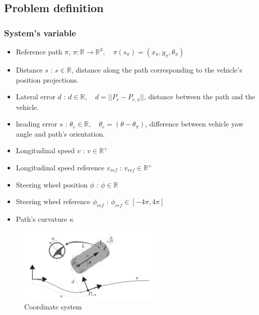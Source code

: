 \subsection{Problem definition}
\subsubsection*{System's variable}
\begin{itemize}
    \item Reference path $\pi$, $\pi : \mathbb{R} \longrightarrow \mathbb{R}^3, \quad \pi(s_\pi) = (x_\pi, y_\pi,\theta_\pi)$
    \item Distance $s$ : $s \in \mathbb{R}$, distance along the path corresponding to the vehicle’s position projections.
    \item Lateral error $d$ : $d \in \mathbb{R},\quad d = ||P_r - P_{r,\pi}||$, distance between the path and the vehicle.
    \item heading error $s$ : $\theta_e \in \mathbb{R}, \quad \theta_e = (\theta - \theta_\pi)$, difference between vehicle yaw angle and path's orientation.
    \item Longitudinal speed $v$ : $v \in \mathbb{R}^+$
    \item Longitudinal speed reference $v_{ref}$ : $v_{ref} \in \mathbb{R}^+$
    \item Steering wheel position $\phi$ : $\phi \in \mathbb{R}$
    \item Steering wheel reference $\phi_{ref}$ : $\phi_{ref} \in [-4\pi,4\pi]$
    \item Path's curvature $\kappa$
\end{itemize}

\begin{figure}[H]
    \centering
    \includegraphics[width=0.6\textwidth]{Latex report/image/system_def.png}
    \caption{Coordinate system}
    \label{fig:sys_def}
\end{figure}


